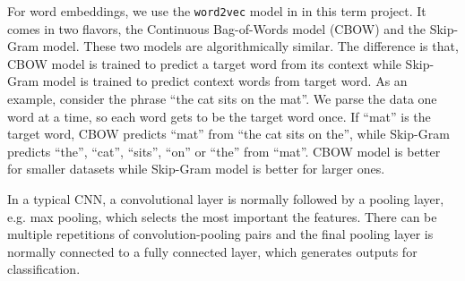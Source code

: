 For word embeddings, we use the {\tt word2vec} model in \cite{mikolov2013} in this term project. It comes in two flavors, the Continuous Bag-of-Words model (CBOW) and the Skip-Gram model. These two models are algorithmically similar. The difference is that, CBOW model is trained to predict a target word from its context while Skip-Gram model is trained to predict context words from target word. As an example, consider the phrase ``the cat sits on the mat''. We parse the data one word at a time, so each word gets to be the target word once. If ``mat'' is the target word, CBOW predicts ``mat'' from ``the cat sits on the'', while Skip-Gram predicts ``the'', ``cat'', ``sits'', ``on'' or ``the'' from ``mat''. CBOW model is better for smaller datasets while Skip-Gram model is better for larger ones.

In a typical CNN, a convolutional layer is normally followed by a pooling layer, e.g. max pooling, which selects the most important the features. There can be multiple repetitions of convolution-pooling pairs and the final pooling layer is normally connected to a fully connected layer, which generates outputs for classification. 
